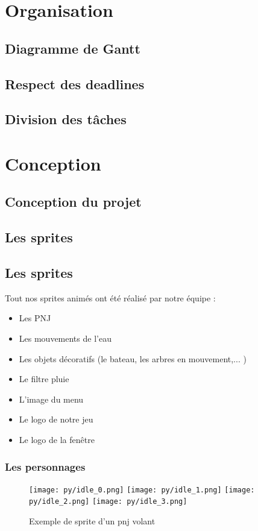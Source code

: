 \documentclass{article}
\begin{document}
\newpage
\section{Organisation}
\subsection{Diagramme de Gantt}
\subsection{Respect des deadlines}
\subsection{Division des tâches}
\section{Conception}
\subsection{Conception du projet}
\subsection{Les sprites}
\subsection{Les sprites}
Tout nos sprites animés ont été réalisé par notre équipe : 
\begin{itemize}
    \item Les PNJ
    \item Les mouvements de l'eau
    \item Les objets décoratifs (le bateau, les arbres en mouvement,... )
    \item Le filtre pluie
    \item L'image du menu
    \item Le logo de notre jeu
    \item Le logo de la fenêtre
\end{itemize}
\subsubsection{Les personnages}
\begin{figure}[h]
    \centering
    \texttt{[image: py/idle\_0.png]}
    \texttt{[image: py/idle\_1.png]}
    \texttt{[image: py/idle\_2.png]}
    \texttt{[image: py/idle\_3.png]}
    \caption{Exemple de sprite d'un pnj volant}
\end{figure}
\end{document}
